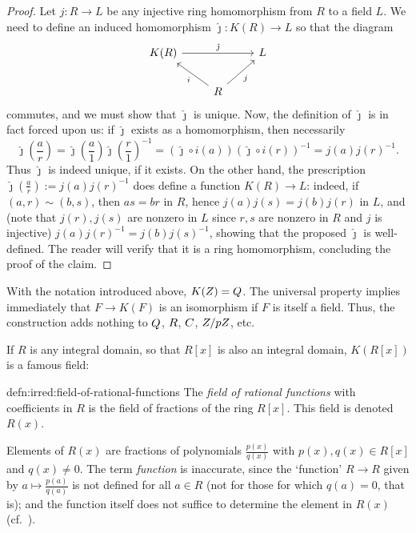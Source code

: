 \begin{proof}
  Let $j : R \to L$ be any injective ring homomorphism from $R$ to a
  field $L$. We need to define an induced homomorphism
  $\hat{\jmath} : K(R) \to L$ so that the diagram
  \[\begin{tikzcd}
      K(R) \arrow[rr, "\hat{\jmath}"] & & L \\
      & R \arrow[ul, "i"] \arrow[ur, "j"']
    \end{tikzcd}\] commutes, and we must show that $\hat{\jmath}$ is
  unique. Now, the definition of $\hat{\jmath}$ is in fact forced upon
  us: if $\hat{\jmath}$ exists as a homomorphism, then necessarily
  \[\hat{\jmath}\!\left(\frac{a}{r}\right)
    = \hat{\jmath}\!\left(\frac{a}{1}\right)
    \hat{\jmath}\!\left(\frac{r}{1}\right)^{-1} = (\hat{\jmath} \circ
    i(a))(\hat{\jmath} \circ i(r))^{-1} = j(a)j(r)^{-1}.\] Thus
  $\hat{\jmath}$ is indeed unique, if it exists. On the other hand,
  the prescription
  $\hat{\jmath}\!\left(\frac{a}{r}\right) := j(a)j(r)^{-1}$ does
  define a function $K(R) \to L$: indeed, if $(a, r) \sim (b, s)$,
  then $as = br$ in $R$, hence $j(a)j(s) = j(b)j(r)$ in $L$, and (note
  that $j(r), j(s)$ are nonzero in $L$ since $r, s$ are nonzero in $R$
  and $j$ is injective) $j(a)j(r)^{-1} = j(b)j(s)^{-1}$, showing that
  the proposed $\hat{\jmath}$ is well-defined. The reader will verify
  that it is a ring homomorphism, concluding the proof of the claim.
\end{proof}
With the notation introduced above, $K(Z) = Q$. The universal
property implies immediately that $F \to K(F)$ is an isomorphism if
$F$ is itself a field. Thus, the construction adds nothing to $Q$,
$R$, $C$, $Z/pZ$, etc.

If $R$ is any integral domain, so that $R[x]$ is also an integral
domain, $K(R[x])$ is a famous field:

\begin{defn}{}{defn:irred:field-of-rational-functions}
  The \emph{field of rational functions} with coefficients in $R$ is
  the field of fractions of the ring $R[x]$. This field is denoted
  $R(x)$.
\end{defn}

Elements of $R(x)$ are fractions of polynomials $\frac{p(x)}{q(x)}$
with $p(x), q(x) \in R[x]$ and $q(x) \neq 0$. The term \emph{function}
is inaccurate, since the `function' $R \to R$ given by
$a \mapsto \frac{p(a)}{q(a)}$ is not defined for all $a \in R$ (not
for those for which $q(a) = 0$, that is); and the function itself does
not suffice to determine the element in $R(x)$ (cf.\
).

